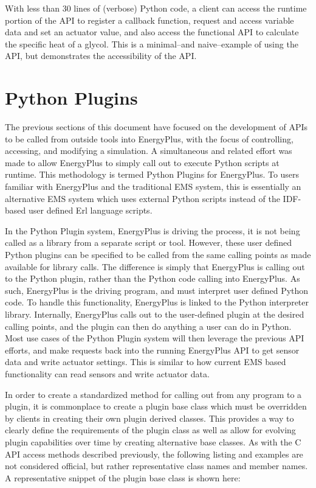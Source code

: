 \documentclass[5p]{elsarticle}
\begin{document}
With less than 30 lines of (verbose) Python code, a client can access the runtime portion of the API to register a callback function, request and access variable data and set an actuator value, and also access the functional API to calculate the specific heat of a glycol.  This is a minimal--and naive--example of using the API, but demonstrates the accessibility of the API.

 \section{Python Plugins}
The previous sections of this document have focused on the development of APIs to be called from outside tools into EnergyPlus, with the focus of controlling, accessing, and modifying a simulation.  A simultaneous and related effort was made to allow EnergyPlus to simply call out to execute Python scripts at runtime.  This methodology is termed Python Plugins for EnergyPlus.  To users familiar with EnergyPlus and the traditional EMS system, this is essentially an alternative EMS system which uses external Python scripts instead of the IDF-based user defined Erl language scripts.

In the Python Plugin system, EnergyPlus is driving the process, it is not being called as a library from a separate script or tool.  However, these user defined Python plugins can be specified to be called from the same calling points as made available for library calls.  The difference is simply that EnergyPlus is calling out to the Python plugin, rather than the Python code calling into EnergyPlus.  As such, EnergyPlus is the driving program, and must interpret user defined Python code.  To handle this functionality, EnergyPlus is linked to the Python interpreter library.    Internally, EnergyPlus calls out to the user-defined plugin at the desired calling points, and the plugin can then do anything a user can do in Python.  Most use cases of the Python Plugin system will then leverage the previous API efforts, and make requests back into the running EnergyPlus API to get sensor data and write actuator settings.  This is similar to how current EMS based functionality can read sensors and write actuator data.

In order to create a standardized method for calling out from any program to a plugin, it is commonplace to create a plugin base class which must be overridden by clients in creating their own plugin derived classes.  This provides a way to clearly define the requirements of the plugin class as well as allow for evolving plugin capabilities over time by creating alternative base classes.  As with the C API access methods described previously, the following listing and examples are not considered official, but rather representative class names and member names.  A representative snippet of the plugin base class is shown here:
\end{document}
